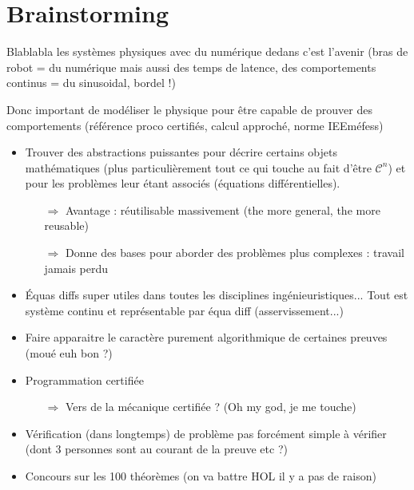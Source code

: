 \documentclass[11pt]{article}
\begin{document}
\section{Brainstorming}

Blablabla les systèmes physiques avec du numérique dedans c'est l'avenir (bras de robot = du numérique mais aussi des temps de latence, des comportements continus = du sinusoidal, bordel !)

Donc important de modéliser le physique pour être capable de prouver des comportements (référence proco certifiés, calcul approché, norme IEEméfess)   

\begin{itemize}
  \item Trouver des abstractions puissantes pour décrire certains objets mathématiques (plus particulièrement tout ce qui touche au fait d'être $\mathcal{C}^n$) et pour les problèmes leur étant associés (équations différentielles).
  \begin{itemize}
    \item[$\Rightarrow$] Avantage : réutilisable massivement (the more general, the more reusable)
    \item[$\Rightarrow$] Donne des bases pour aborder des problèmes plus complexes : travail jamais perdu
  \end{itemize}

  \item Équas diffs super utiles dans toutes les disciplines ingénieuristiques... Tout est système continu et représentable par équa diff (asservissement...)

  \item Faire apparaitre le caractère purement algorithmique de certaines preuves (moué euh bon ?)
  \item Programmation certifiée
  \begin{itemize}
    \item[$\Rightarrow$] Vers de la mécanique certifiée ? (Oh my god, je me touche)
  \end{itemize}

  \item Vérification (dans longtemps) de problème pas forcément simple à vérifier (dont 3 personnes sont au courant de la preuve etc ?)
  \item Concours sur les 100 théorèmes (on va battre HOL il y a pas de raison)
\end{itemize}


\end{document}
